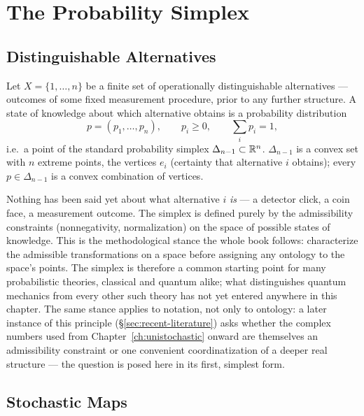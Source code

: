 \chapter{The Probability Simplex}
\label{ch:simplex}

\section{Distinguishable Alternatives}

Let $X = \{1,\dots,n\}$ be a finite set of operationally distinguishable
alternatives — outcomes of some fixed measurement procedure, prior to any
further structure. A state of knowledge about which alternative obtains is a
probability distribution
\begin{equation}
p = (p_1,\dots,p_n), \qquad p_i \ge 0, \qquad \sum_i p_i = 1,
\end{equation}
i.e.\ a point of the standard probability simplex $\Delta_{n-1} \subset
\mathbb{R}^n$. $\Delta_{n-1}$ is a convex set with $n$ extreme points, the vertices
$e_i$ (certainty that alternative $i$ obtains); every $p \in \Delta_{n-1}$ is a
convex combination of vertices.

\begin{remark}
Nothing has been said yet about what alternative $i$ \emph{is} — a detector
click, a coin face, a measurement outcome. The simplex is defined purely by the
admissibility constraints (nonnegativity, normalization) on the space of
possible states of knowledge. This is the methodological stance the whole book
follows: characterize the admissible transformations on a space before
assigning any ontology to the space's points. The simplex is therefore a
common starting point for many probabilistic theories, classical and
quantum alike; what distinguishes quantum mechanics from every other such
theory has not yet entered anywhere in this chapter. The same stance applies to
notation, not only to ontology: a later instance of this principle
(\S\ref{sec:recent-literature}) asks whether the complex numbers used from
Chapter~\ref{ch:unistochastic} onward are themselves an admissibility
constraint or one convenient coordinatization of a deeper real structure —
the question is posed here in its first, simplest form.
\end{remark}

\section{Stochastic Maps}


